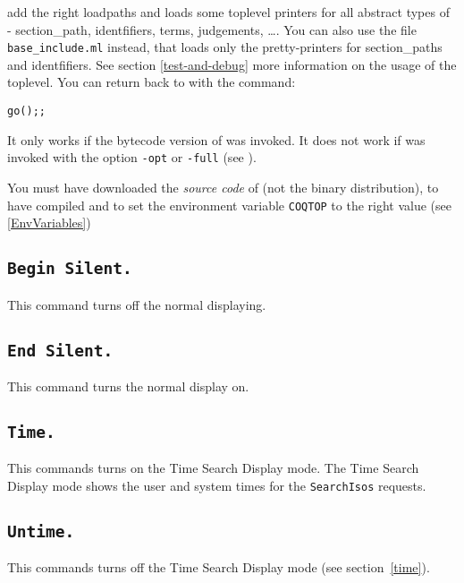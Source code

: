 \noindent add the right loadpaths and loads some toplevel printers for
all abstract types of \Coq - section\_path, identfifiers, terms, judgements,
\dots. You can also use the file \texttt{base\_include.ml} instead,
that loads only the pretty-printers for section\_paths and
identfifiers. See section \ref{test-and-debug} more information on the
usage of the toplevel. You can return back to \Coq{} with the command: 

\begin{flushleft}
\begin{verbatim}
go();;
\end{verbatim}
\end{flushleft}

\begin{Warnings}
\item It only works if the bytecode version of {\Coq} was
invoked. It does not work if {\Coq} was invoked with the option 
{\tt -opt} or {\tt -full} (see \pageref{binary-images}).
\item You must have downloaded the \emph{source code} of \Coq{} (not the
  binary distribution), to have compiled \Coq{} and to set the
  environment variable \texttt{COQTOP} to the right value (see
  \ref{EnvVariables})
\end{Warnings}

\subsection{\tt Begin Silent.}
\label{Begin-Silent}
This command turns off the normal displaying.

\subsection{\tt End Silent.}
This command turns the normal display on.

\subsection{\tt Time.}
\label{time}
This commands turns on the Time Search Display mode. The Time Search Display
mode shows the user and system times for the {\tt SearchIsos} requests.

\subsection{\tt Untime.}
This commands turns off the Time Search Display mode (see section~\ref{time}).





